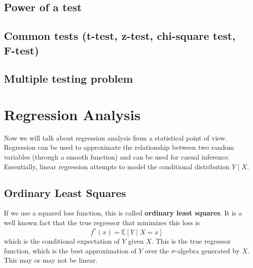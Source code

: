 \documentclass{article}
\begin{document}
  \subsection{Power of a test}

  \subsection{Common tests (t-test, z-test, chi-square test, F-test)}

  \subsection{Multiple testing problem}

\section{Regression Analysis}

    Now we will talk about regression analysis from a statistical point of view. Regression can be used to approximate the relationship between two random variables (through a smooth function) and can be used for casual inference. Essentially, linear regression attempts to model the conditional distribution $Y \mid X$. 

  \subsection{Ordinary Least Squares}

    If we use a squared loss function, this is called \textbf{ordinary least squares}. It is a well known fact that the true regressor that minimizes this loss is 
    \begin{equation}
      f^\ast (x) = \mathbb{E}[Y \mid X = x]
    \end{equation}
    which is the conditional expectation of $Y$ given $X$. This is the true regressor function, which is the best approximation of $Y$ over the $\sigma$-algebra generated by $X$. This may or may not be linear. 
\end{document}
